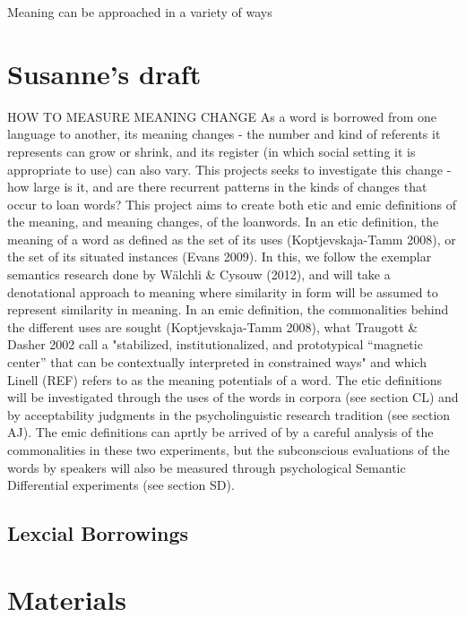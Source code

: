 \documentclass[a4paper]{article}
\begin{document}
Meaning can be approached in a variety of ways \citep{Koptjevskaja-Tamm2008}


\section{Susanne's draft}
HOW TO MEASURE MEANING CHANGE
As a word is borrowed from one language to another, its meaning changes - the number and kind of referents it represents can grow or shrink, and its register (in which social setting it is appropriate to use) can also vary. This projects seeks to investigate this change - how large is it, and are there recurrent patterns in the kinds of changes that occur to loan words? 
This project aims to create both etic and emic definitions of the meaning, and meaning changes, of the loanwords. In an etic definition, the meaning of a word as defined as the set of its uses (Koptjevskaja-Tamm 2008), or the set of its situated instances (Evans 2009). In this, we follow the exemplar semantics research done by Wälchli \& Cysouw (2012), and will take a denotational approach to meaning where similarity in form will be assumed to represent similarity in meaning. In an emic definition, the commonalities behind the different uses are sought (Koptjevskaja-Tamm 2008), what Traugott \& Dasher 2002 call a "stabilized, institutionalized, and prototypical “magnetic center” that can be contextually interpreted in constrained ways" and which Linell (REF) refers to as the meaning potentials of a word.
The etic definitions will be investigated through the uses of the words in corpora (see section CL) and by acceptability judgments in the psycholinguistic research tradition (see section AJ). The emic definitions can aprtly be arrived of by a careful analysis of the commonalities in these two experiments, but the subconscious evaluations of the words by speakers will also be measured through psychological Semantic Differential experiments (see section SD).


\subsection{Lexcial Borrowings}

\citet{Matras2009}

\section{Materials} 
\end{document}

